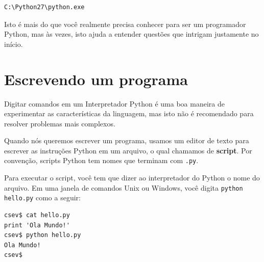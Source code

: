 \beforeverb
\begin{verbatim}
C:\Python27\python.exe
\end{verbatim}
\afterverb

Isto é mais do que você realmente precisa conhecer para ser um programador Python, mas
às vezes, isto ajuda a entender questões que intrigam justamente no início.
%

\section{Escrevendo um programa}
%

Digitar comandos em um Interpretador Python é uma boa maneira de experimentar
as características da linguagem, mas isto não é recomendado para resolver 
problemas mais complexos.
%

Quando nós queremos escrever um programa,
usamos um editor de texto para escrever as instruções Python em um arquivo,
o qual chamamos de {\bf script}. Por convenção,
scripts Python tem nomes que terminam com {\tt .py}.
%

%

Para executar o script, você tem que dizer ao interpretador do Python
o nome do arquivo. Em uma janela de comandos Unix ou Windows, você digita
{\tt python hello.py} como a seguir:
%

\beforeverb
\begin{verbatim}
csev$ cat hello.py
print 'Ola Mundo!'
csev$ python hello.py
Ola Mundo!
csev$
\end{verbatim}
\afterverb

